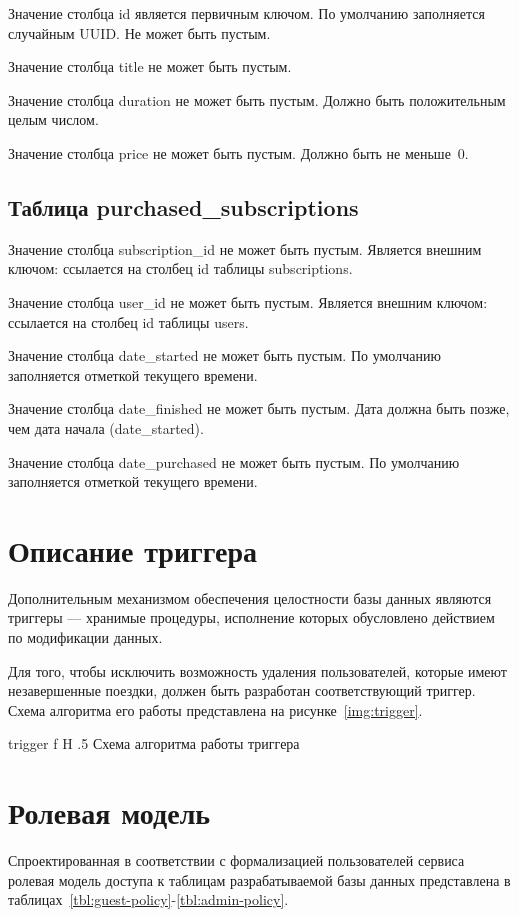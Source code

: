 Значение столбца id является первичным ключом. По умолчанию заполняется случайным UUID. Не может быть пустым.

Значение столбца title не может быть пустым.

Значение столбца duration не может быть пустым. Должно быть положительным целым числом.

Значение столбца price не может быть пустым. Должно быть не меньше~0.

\subsection*{Таблица purchased\_subscriptions}

Значение столбца subscription\_id не может быть пустым. Является внешним ключом: ссылается на столбец id таблицы subscriptions.

Значение столбца user\_id не может быть пустым. Является внешним ключом: ссылается на столбец id таблицы users.

Значение столбца date\_started не может быть пустым. По умолчанию заполняется отметкой текущего времени.

Значение столбца date\_finished не может быть пустым. Дата должна быть позже, чем дата начала (date\_started).

Значение столбца date\_purchased не может быть пустым. По умолчанию заполняется отметкой текущего времени.

\pagebreak
\section{Описание триггера}

Дополнительным механизмом обеспечения целостности базы данных являются триггеры --- хранимые процедуры, исполнение которых обусловлено действием по модификации данных.

Для того, чтобы исключить возможность удаления пользователей, которые имеют незавершенные поездки, должен быть разработан соответствующий триггер. Схема алгоритма его работы представлена на рисунке~\ref{img:trigger}.

{trigger}
{f}
{H}
{.5\textwidth}
{Схема алгоритма работы триггера}

\section{Ролевая модель}

Спроектированная в соответствии с формализацией пользователей сервиса ролевая модель доступа к таблицам разрабатываемой базы данных представлена в таблицах~\ref{tbl:guest-policy}-\ref{tbl:admin-policy}.

